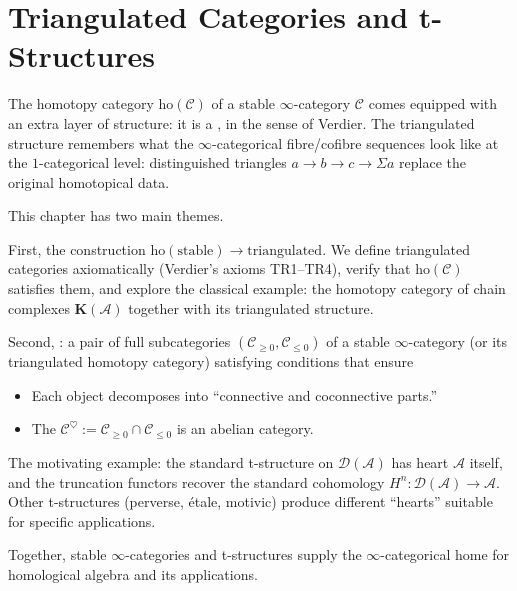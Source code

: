 
\chapter{Triangulated Categories and t-Structures}

\begin{overviewbox}
The homotopy category $\mathrm{ho}(\mathcal{C})$ of a stable
$\infty$-category $\mathcal{C}$ comes equipped with an extra layer of
structure: it is a , in the sense of Verdier.
The triangulated structure remembers what the $\infty$-categorical fibre/cofibre
sequences look like at the $1$-categorical level: distinguished triangles
$a \to b \to c \to \Sigma a$ replace the original homotopical data.

This chapter has two main themes.

First, the construction $\mathrm{ho}(\mathrm{stable}) \to \mathrm{triangulated}$.
We define triangulated categories axiomatically (Verdier's axioms TR1–TR4),
verify that $\mathrm{ho}(\mathcal{C})$ satisfies them, and explore the
classical example: the homotopy category of chain complexes
$\mathbf{K}(\mathcal{A})$ together with its triangulated structure.

Second, : a pair of full subcategories $(\mathcal{C}_{\geq 0},
\mathcal{C}_{\leq 0})$ of a stable $\infty$-category (or its triangulated
homotopy category) satisfying conditions that ensure
\begin{itemize}
  \item Each object decomposes into ``connective and coconnective parts.''
  \item The  $\mathcal{C}^\heartsuit := \mathcal{C}_{\geq 0}
        \cap \mathcal{C}_{\leq 0}$ is an abelian category.
\end{itemize}

The motivating example: the standard t-structure on
$\mathcal{D}(\mathcal{A})$ has heart $\mathcal{A}$ itself, and the
truncation functors recover the standard cohomology
$H^n : \mathcal{D}(\mathcal{A}) \to \mathcal{A}$. Other t-structures
(perverse, étale, motivic) produce different ``hearts'' suitable for
specific applications.

Together, stable $\infty$-categories and t-structures supply the
$\infty$-categorical home for homological algebra and its applications.
\end{overviewbox}


